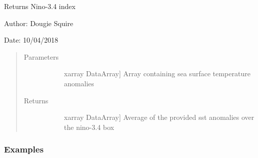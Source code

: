 \documentclass[letterpaper,10pt,english]{sphinxmanual}
\begin{document}

\begin{fulllineitems}
\label{\detokenize{diagnostic_doc:diagnostic.nino34}}
Returns Nino-3.4 index

\begin{DUlineblock}{0em}
\item[] Author: Dougie Squire
\item[] Date: 10/04/2018
\end{DUlineblock}
\begin{quote}\begin{description}
\item[{Parameters}] \leavevmode\begin{description}
\item[{}] \leavevmode{[}xarray DataArray{]}
Array containing sea surface temperature anomalies

\end{description}

\item[{Returns}] \leavevmode\begin{description}
\item[{}] \leavevmode{[}xarray DataArray{]}
Average of the provided sst anomalies over the nino-3.4 box

\end{description}

\end{description}\end{quote}
\subsubsection*{Examples}


\end{fulllineitems}
\end{document}
